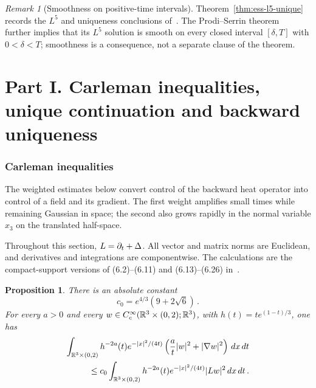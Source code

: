 \documentclass[11pt,letterpaper]{article}
\numberwithin{equation}{section}
\theoremstyle{plain}
\newtheorem{proposition}[theorem]{Proposition}
\theoremstyle{definition}
\theoremstyle{remark}
\newtheorem{remark}[theorem]{Remark}
\begin{document}
\begin{remark}[Smoothness on positive-time intervals]\label{rem:not-claimed}
Theorem~\ref{thm:ess-l5-unique} records the $L^5$ and uniqueness conclusions of~\cite[Theorem~1.3]{ESS2003}. The Prodi--Serrin theorem~\cite[Theorem~8.17, printed p.~173]{RobinsonRodrigoSadowski2016} further implies that its $L^5$ solution is smooth on every closed interval $[\delta,T]$ with $0<\delta<T$; smoothness is a consequence, not a separate clause of the theorem.
\end{remark}

\part*{Part I. Carleman inequalities, unique continuation and backward uniqueness}

\section{Carleman inequalities}\label{sec:carleman}

The weighted estimates below convert control of the backward heat operator into control of a field and its gradient. The first weight amplifies small times while remaining Gaussian in space; the second also grows rapidly in the normal variable $x_3$ on the translated half-space.

Throughout this section, $L=\partial_t+\Delta$. All vector and matrix norms are Euclidean, and derivatives and integrations are componentwise. The calculations are the compact-support versions of (6.2)--(6.11) and (6.13)--(6.26) in~\cite{ESS2003}.

\begin{proposition}\label{prop:carleman-gauss}
There is an absolute constant
\[
 c_0=e^{4/3}(9+2\sqrt{6})\,.
\]
For every $a>0$ and every $w\in C_c^\infty(\mathbb{R}^3\times(0,2);\mathbb{R}^3)$, with
$h(t)=t e^{(1-t)/3}$, one has
\begin{equation}\label{eq:carleman-gauss}
\begin{aligned}
 \int_{\mathbb{R}^3\times(0,2)} h^{-2a}(t)e^{-|x|^2/(4t)}
 \left(\frac{a}{t}|w|^2+|\nabla w|^2\right)\,dx\,dt\\
 \le c_0\int_{\mathbb{R}^3\times(0,2)}h^{-2a}(t)e^{-|x|^2/(4t)}|Lw|^2\,dx\,dt\,.
\end{aligned}
\end{equation}
\end{proposition}
\end{document}
